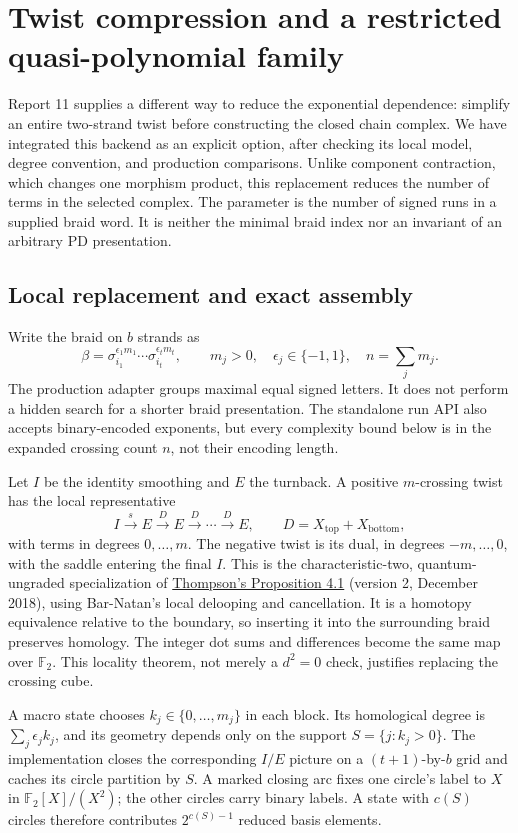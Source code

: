 \section{Twist compression and a restricted quasi-polynomial family}
\label{sec:twist-integration}

Report 11 supplies a different way to reduce the exponential dependence:
simplify an entire two-strand twist before constructing the closed chain
complex. We have integrated this backend as an explicit option, after
checking its local model, degree convention, and production comparisons.
Unlike component contraction, which changes one morphism product, this
replacement reduces the number of terms in the selected complex.
The parameter is the number of signed runs in a supplied braid word.
It is neither the minimal braid index nor an invariant of an arbitrary
PD presentation.

\subsection{Local replacement and exact assembly}
Write the braid on $b$ strands as
\[
 \beta=\sigma_{i_1}^{\epsilon_1m_1}\cdots
        \sigma_{i_t}^{\epsilon_tm_t},
 \qquad m_j>0,\quad \epsilon_j\in\{-1,1\},\quad n=\sum_jm_j.
\]
The production adapter groups maximal equal signed letters. It does not
perform a hidden search for a shorter braid presentation. The standalone
run API also accepts binary-encoded exponents, but every complexity bound
below is in the expanded crossing count $n$, not their encoding length.

Let $I$ be the identity smoothing and $E$ the turnback. A positive
$m$-crossing twist has the local representative
\[
 I\xrightarrow{s}E\xrightarrow{D}E\xrightarrow{D}\cdots
 \xrightarrow{D}E,\qquad D=X_{\mathrm{top}}+X_{\mathrm{bottom}},
\]
with terms in degrees $0,\ldots,m$. The negative twist is its dual,
in degrees $-m,\ldots,0$, with the saddle entering the final $I$.
This is the characteristic-two, quantum-ungraded specialization of
\href{https://arxiv.org/abs/1701.07525}{Thompson's Proposition 4.1}
(version 2, December 2018), using Bar-Natan's local delooping and
cancellation. It is a homotopy equivalence relative to the boundary,
so inserting it into the surrounding braid preserves homology.
The integer dot sums and differences become the same map over
$\mathbb F_2$. This locality theorem, not merely a $d^2=0$ check,
justifies replacing the crossing cube.

A macro state chooses $k_j\in\{0,\ldots,m_j\}$ in each block.
Its homological degree is $\sum_j\epsilon_j k_j$, and its geometry
depends only on the support $S=\{j:k_j>0\}$. The implementation closes
the corresponding $I/E$ picture on a $(t+1)$-by-$b$ grid and caches
its circle partition by $S$. A marked closing arc fixes one circle's
label to $X$ in $\mathbb F_2[X]/(X^2)$; the other circles carry binary
labels. A state with $c(S)$ circles therefore contributes $2^{c(S)-1}$
reduced basis elements.

